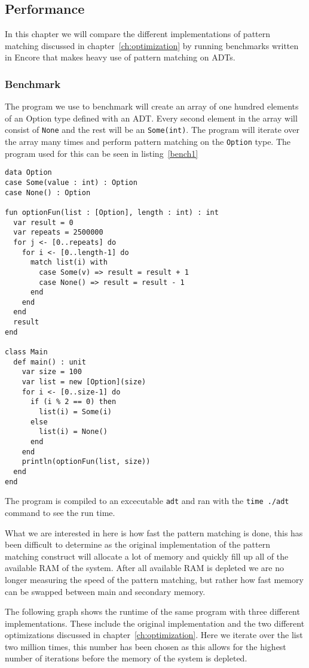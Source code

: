 \documentclass[10pt]{report}
\def\code#1{\texttt{#1}} %
\begin{document}
\subsection{Performance}
\par{In this chapter we will compare the different implementations of pattern matching discussed in chapter~\ref{ch:optimization} by running benchmarks written in Encore that makes heavy use of pattern matching on ADTs.}
\subsubsection{Benchmark}
\par{The program we use to benchmark will create an array of one hundred elements of an Option type defined with an ADT. Every second element in the array will consist of \code{None} and the rest will be an \code{Some(int)}. The program will iterate over the array many times and perform pattern matching on the \code{Option} type. The program used for this can be seen in listing~\ref{bench1}}

\begin{lstlisting}[language=encore,caption={Program used for benchmarking},label=AST]
data Option
case Some(value : int) : Option
case None() : Option

fun optionFun(list : [Option], length : int) : int
  var result = 0
  var repeats = 2500000
  for j <- [0..repeats] do
    for i <- [0..length-1] do
      match list(i) with
        case Some(v) => result = result + 1
        case None() => result = result - 1
      end
    end
  end
  result
end

class Main
  def main() : unit
    var size = 100
    var list = new [Option](size)
    for i <- [0..size-1] do
      if (i % 2 == 0) then
        list(i) = Some(i)
      else
        list(i) = None()
      end
    end
    println(optionFun(list, size))
  end
end
\end{lstlisting}
\par{The program is compiled to an excecutable \code{adt} and ran with the \code{time ./adt} command to see the run time.}
\par{What we are interested in here is how fast the pattern matching is done, this has been difficult to determine as the original implementation of the pattern matching construct will allocate a lot of memory and quickly fill up all of the available RAM of the system. After all available RAM is depleted we are no longer measuring the speed of the pattern matching, but rather how fast memory can be swapped between main and secondary memory.}
\par{The following graph shows the runtime of the same program with three different implementations. These include the original implementation and the two different optimizations discussed in chapter~\ref{ch:optimization}. Here we iterate over the list two million times, this number has been chosen as this allows for the highest number of iterations before the memory of the system is depleted.}
\end{document}

